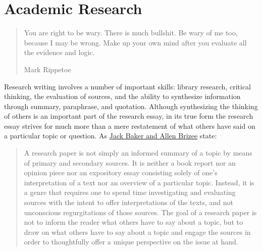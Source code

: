 
\chapter{Academic Research}

\hypertarget{academicresearch}{}




\begin{quote} \small You are right to be wary. There is much bullshit. Be wary of me too, because
I may be wrong. Make up your own mind after you evaluate all the evidence and logic.

\textemdash Mark Rippetoe

\end{quote}

Research writing involves a number of important skills: library research,
critical thinking, the evaluation of sources, and the ability to synthesize
information through summary, paraphrase, and quotation. Although synthesizing
the thinking of others is an important part of the research essay, in its true
form the research essay strives for much more than a mere restatement of  what
others have said on a particular topic or question. As
\href{http://owl.english.purdue.edu/owl/resource/658/02/}{Jack Baker and Allen
Brizee} state:

\begin{quote}

A research paper is not simply an informed summary of a topic by
means of primary and secondary sources. It is neither a book report nor an
opinion piece nor an expository essay consisting solely of one's interpretation
of a text nor an overview of a particular topic. Instead, it is a genre that
requires one to spend time investigating and evaluating sources with the intent
to offer interpretations of the texts, and not unconscious regurgitations of
those sources. The goal of a research paper is not to inform the reader what
others have to say about a topic, but to draw on what others have to say about
a topic and engage the sources in order to thoughtfully offer a unique
perspective on the issue at hand.\end{quote}

